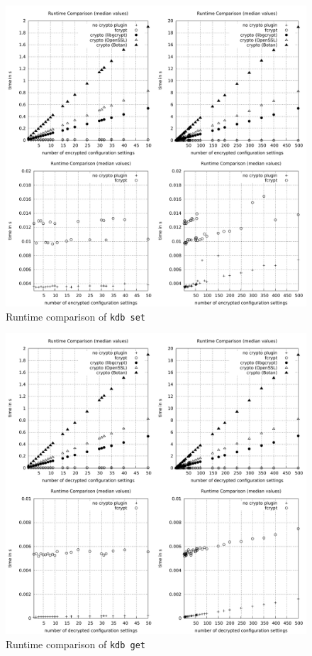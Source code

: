 \begin{figure}[h]
\center
\caption{Runtime comparison of \texttt{kdb set}}
\label{eval-runtime-comp-set}
\includegraphics[width=\columnwidth]{plots/comp_median_set.pdf}
\end{figure}

\begin{figure}[h]
\center
\caption{Runtime comparison of \texttt{kdb get}}
\label{eval-runtime-comp-get}
\includegraphics[width=\columnwidth]{plots/comp_median_get.pdf}
\end{figure}

